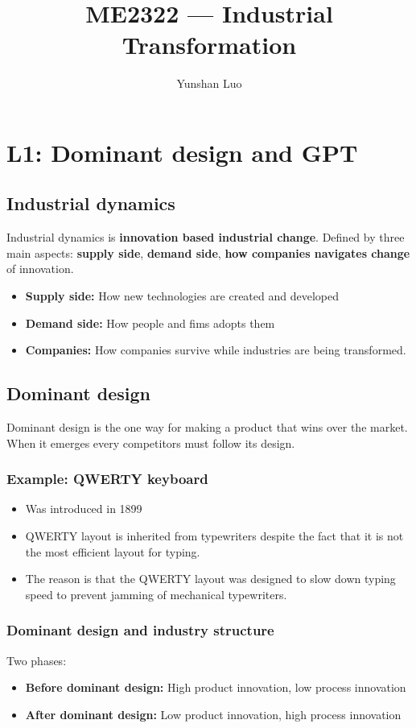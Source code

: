 \documentclass[12pt,a4paper]{article}
\begin{document}
\author{Yunshan Luo}
\title{ME2322 --- Industrial Transformation}
\maketitle
\newpage

\section{L1: Dominant design and GPT}
\subsection{Industrial dynamics}
Industrial dynamics is \textbf{innovation based industrial change}. Defined by three main aspects: \textbf{supply side}, \textbf{demand side}, \textbf{how companies navigates change} of innovation.
\begin{itemize}
    \item \textbf{Supply side:} How new technologies are created and developed
    \item \textbf{Demand side:} How people and fims adopts them
    \item \textbf{Companies:} How companies survive while industries are being transformed.
\end{itemize}

\subsection{Dominant design}
Dominant design is the one way for making a product that wins over the market. When it emerges every competitors must follow its design.

\subsubsection{Example: QWERTY keyboard}
\begin{itemize}
    \item Was introduced in 1899 
    \item QWERTY layout is inherited from typewriters despite the fact that it is not the most efficient layout for typing.
    \item The reason is that the QWERTY layout was designed to slow down typing speed to prevent jamming of mechanical typewriters. 
\end{itemize}   

\subsubsection{Dominant design and industry structure}
Two phases:
\begin{itemize}
    \item \textbf{Before dominant design:} High product innovation, low process innovation
    \item \textbf{After dominant design:} Low product innovation, high process innovation
\end{itemize}
\end{document}

